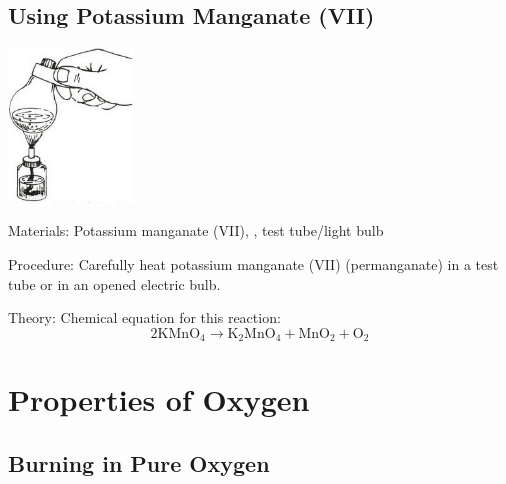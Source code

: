 \begin{multicols}{2}
\vfill
\columnbreak

\subsection{Using Potassium Manganate (VII)} %

\begin{center}
\includegraphics[width=0.25\textwidth]{./img/source/oxygen-prep.jpg}
\end{center}

\begin{description*}
\item[Materials:]{Potassium manganate (VII), , test tube/light bulb}
\item[Procedure:]{Carefully heat potassium manganate (VII) (permanganate) in a test
tube or in an opened electric bulb.}
\item[Theory:]{Chemical equation for this reaction: \[ 2\mathrm{K}\mathrm{Mn}\mathrm{O}_4 \longrightarrow \mathrm{K}_2\mathrm{Mn}\mathrm{O}_4 + \mathrm{Mn}\mathrm{O}_2 + \mathrm{O}_2 \]}
\end{description*}


\section*{Properties of Oxygen} 


\subsection{Burning in Pure Oxygen}


\end{multicols}
